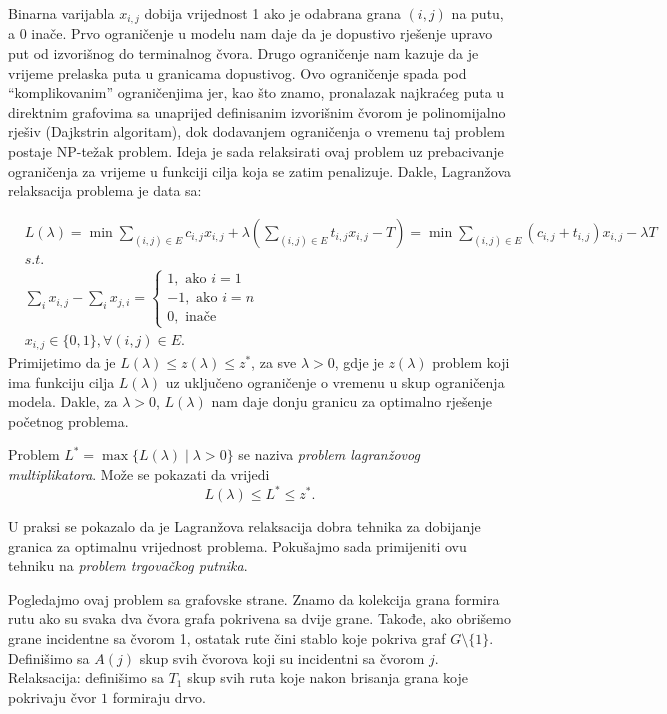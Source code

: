 \documentclass[a4paper, utf8, 11pt, colorlinks]{book}
\begin{document}
Binarna varijabla $x_{i,j}$ dobija vrijednost 1 ako je odabrana grana $(i,j)$ na   putu, a 0 inače.  
Prvo ograničenje u modelu nam daje da je dopustivo rješenje upravo put od izvorišnog do terminalnog čvora. Drugo ograničenje nam kazuje da je vrijeme prelaska puta u granicama dopustivog. Ovo ograničenje spada pod ``komplikovanim'' ograničenjima jer, kao što znamo,  pronalazak najkraćeg puta u direktnim grafovima sa unaprijed definisanim izvorišnim čvorom je polinomijalno rješiv (Dajkstrin algoritam), dok dodavanjem ograničenja o vremenu taj problem postaje NP-težak problem. Ideja je sada relaksirati ovaj problem uz prebacivanje ograničenja za vrijeme u funkciji cilja koja se zatim penalizuje. 
Dakle, Lagranžova relaksacija problema je data sa:

\begin{align*}
       &L(\lambda)= \min\sum_{(i,j) \in E }c_{i,j}x_{i,j}  + \lambda(\sum_{(i,j) \in E} t_{i,j} x_{i,j} - T ) = \min \sum_{(i,j) \in E} (c_{i,j} + t_{i,j} )x_{i,j} - \lambda T \\
        &{s.t. }\\
    & \sum_{i} x_{i,j} - \sum_{i} x_{j,i} = \begin{cases}  
                                               1, \mbox{ ako } i=1 \\
                                              -1, \mbox{ ako } i=n \\
                                               0, \mbox{ inače }
                                            \end{cases} \\
     & x_{i,j} \in \{0, 1 \}, \forall (i,j) \in E.
\end{align*}
Primijetimo da je $L(\lambda) \leq z(\lambda)  \leq z^*$, za sve $\lambda > 0$, gdje je $z(\lambda)$ problem koji ima funkciju cilja $L(\lambda)$ uz uključeno ograničenje o vremenu u skup ograničenja modela. Dakle, za $\lambda >0$, $L(\lambda)$ nam daje donju granicu za optimalno rješenje početnog problema. 

Problem $L^* = \max \{ L(\lambda) \mid \lambda > 0  \}$ se naziva \emph{problem lagranžovog multiplikatora}. Može se pokazati da vrijedi 
$$ L(\lambda) \leq L^* \leq z^*.$$

U praksi se pokazalo da je Lagranžova relaksacija dobra tehnika za dobijanje granica za optimalnu vrijednost problema. Pokušajmo sada primijeniti ovu tehniku na \emph{problem trgovačkog putnika}.  

Pogledajmo ovaj problem sa grafovske strane. Znamo da kolekcija grana formira rutu ako su svaka dva čvora grafa pokrivena sa dvije grane. Takođe, ako obrišemo grane incidentne sa čvorom 1, ostatak rute čini stablo koje pokriva graf  $G\setminus \{1\}$.  
Definišimo sa $A(j)$ skup svih čvorova koji su incidentni sa čvorom $j$. Relaksacija: definišimo sa $T_1$ skup svih ruta koje nakon brisanja grana koje pokrivaju čvor $1$ formiraju drvo.  
\end{document}
